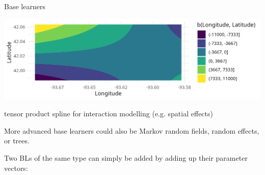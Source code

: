 \documentclass[11pt,compress,t,notes=noshow, xcolor=table]{beamer}
\begin{document}
\begin{vbframe}{Base learners}
\begin{minipage}{0.4\textwidth}
    \includegraphics[width=\linewidth]{figure/compboost-base-learner-tensor.png}
\end{minipage}\hfill
\begin{minipage}{0.5\textwidth}
  tensor product spline for interaction modelling (e.g. spatial effects)
\end{minipage}

\vspace{\baselineskip}

More advanced base learners could also be  Markov random fields, random effects, or trees.

\framebreak

Two BLs of the same type can simply be added by adding up their parameter vectors:


\end{vbframe}
\end{document}
